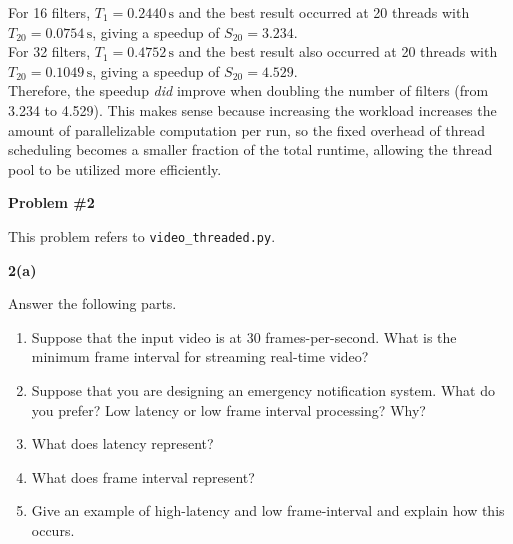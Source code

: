 \documentclass[11pt]{article}
\begin{document}
	For 16 filters, $T_{1}=0.2440\,\text{s}$ and the best result occurred at 20 threads with $T_{20}=0.0754\,\text{s}$, giving a speedup of $S_{20}=3.234$.\\
	
	For 32 filters, $T_{1}=0.4752\,\text{s}$ and the best result also occurred at 20 threads with $T_{20}=0.1049\,\text{s}$, giving a speedup of $S_{20}=4.529$.\\
	
	Therefore, the speedup \emph{did} improve when doubling the number of filters (from 3.234 to 4.529). This makes sense because increasing the workload increases the amount of parallelizable computation per run, so the fixed overhead of thread scheduling becomes a smaller fraction of the total runtime, allowing the thread pool to be utilized more efficiently.
	
	\newpage
	
	\textbf{Problem \#2}
	
	This problem refers to \texttt{video\_threaded.py}.
	
	\textbf{2(a)}
	
	Answer the following parts.
	
	\begin{enumerate}
		\item[i.] Suppose that the input video is at 30 frames-per-second. What is the minimum frame interval for streaming real-time video?
		
		\item[ii.] Suppose that you are designing an emergency notification system. What do you prefer? Low latency or low frame interval processing? Why?
		
		\item[iii.] What does latency represent?
		
		\item[iv.] What does frame interval represent?
		
		\item[v.] Give an example of high-latency and low frame-interval and explain how this occurs.
	\end{enumerate}
	
\end{document}
